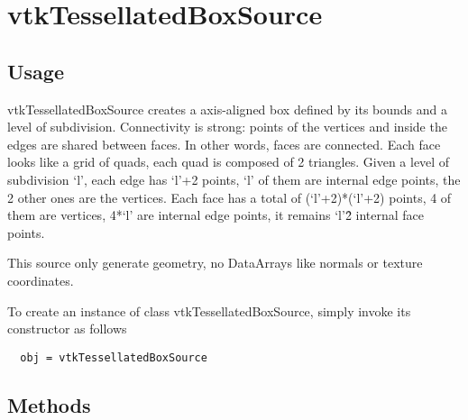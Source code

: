 \section{vtkTessellatedBoxSource}

\subsection{Usage}

 vtkTessellatedBoxSource creates a axis-aligned box defined by its bounds
 and a level of subdivision. Connectivity is strong: points of the vertices
 and inside the edges are shared between faces. In other words, faces are
 connected. Each face looks like a grid of quads, each quad is composed of
 2 triangles.
 Given a level of subdivision `l', each edge has `l'+2 points, `l' of them
 are internal edge points, the 2 other ones are the vertices.
 Each face has a total of (`l'+2)*(`l'+2) points, 4 of them are vertices,
 4*`l' are internal edge points, it remains `l'\^2 internal face points.

 This source only generate geometry, no DataArrays like normals or texture
 coordinates.

To create an instance of class vtkTessellatedBoxSource, simply
invoke its constructor as follows
\begin{verbatim}
  obj = vtkTessellatedBoxSource
\end{verbatim}
\subsection{Methods}

